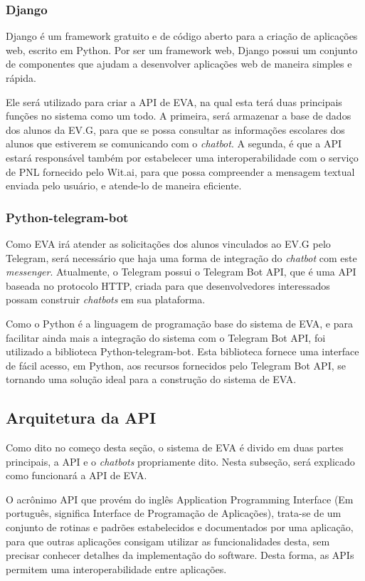 \subsubsection{Django}

Django é um framework gratuito e de código aberto para a criação de aplicações web, escrito em Python. Por ser um framework web, Django possui um conjunto de componentes que ajudam a desenvolver aplicações web de maneira simples e rápida.

Ele será utilizado para criar a API de EVA, na qual esta terá duas principais funções no sistema como um todo. A primeira, será armazenar a base de dados dos alunos da EV.G, para que se possa consultar as informações escolares dos alunos que estiverem se comunicando com o \textit{chatbot}. A segunda, é que a API estará responsável também por estabelecer uma interoperabilidade com o serviço de PNL fornecido pelo Wit.ai, para que possa compreender a mensagem textual enviada pelo usuário, e atende-lo de maneira eficiente.

\subsubsection{Python-telegram-bot}

Como EVA irá atender as solicitações dos alunos vinculados ao EV.G pelo Telegram, será necessário que haja uma forma de integração do \textit{chatbot} com este \textit{messenger}. Atualmente, o Telegram possui o Telegram Bot API, que é uma API baseada no protocolo HTTP, criada para que desenvolvedores interessados possam construir \textit{chatbots} em sua plataforma.

Como o Python é a linguagem de programação base do sistema de EVA, e para facilitar ainda mais a integração do sistema com o Telegram Bot API, foi utilizado a biblioteca Python-telegram-bot. Esta biblioteca fornece uma interface de fácil acesso, em Python, aos recursos fornecidos pelo Telegram Bot API, se tornando uma solução ideal para a construção do sistema de EVA.

\subsection{Arquitetura da API}

Como dito no começo desta seção, o sistema de EVA é divido em duas partes principais, a API e o \textit{chatbots} propriamente dito. Nesta subseção, será explicado como funcionará a API de EVA.

O acrônimo API que provém do inglês Application Programming Interface (Em português, significa Interface de Programação de Aplicações), trata-se de um conjunto de rotinas e padrões estabelecidos e documentados por uma aplicação, para que outras aplicações consigam utilizar as funcionalidades desta, sem precisar conhecer detalhes da implementação do software. Desta forma, as APIs permitem uma interoperabilidade entre aplicações.

